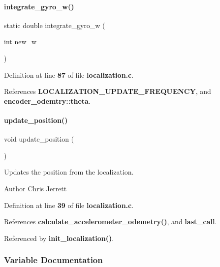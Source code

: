 \paragraph{integrate\+\_\+gyro\+\_\+w()}
{\footnotesize\ttfamily static double integrate\+\_\+gyro\+\_\+w (\begin{DoxyParamCaption}\item[{int}]{new\+\_\+w }\end{DoxyParamCaption})\hspace{0.3cm}{\ttfamily [static]}}



Definition at line \textbf{ 87} of file \textbf{ localization.\+c}.



References \textbf{ L\+O\+C\+A\+L\+I\+Z\+A\+T\+I\+O\+N\+\_\+\+U\+P\+D\+A\+T\+E\+\_\+\+F\+R\+E\+Q\+U\+E\+N\+CY}, and \textbf{ encoder\+\_\+odemtry\+::theta}.

\mbox{\label{localization_8c_afacd5e0b3d5e677df26a4402bbd9ec9e}} 
\paragraph{update\+\_\+position()}
{\footnotesize\ttfamily void update\+\_\+position (\begin{DoxyParamCaption}{ }\end{DoxyParamCaption})}



Updates the position from the localization. 

\begin{DoxyAuthor}{Author}
Chris Jerrett 
\end{DoxyAuthor}


Definition at line \textbf{ 39} of file \textbf{ localization.\+c}.



References \textbf{ calculate\+\_\+accelerometer\+\_\+odemetry()}, and \textbf{ last\+\_\+call}.



Referenced by \textbf{ init\+\_\+localization()}.



\subsubsection{Variable Documentation}
\mbox{\label{localization_8c_a46b8f25ffa3bbee071a0468eac654393}} 
